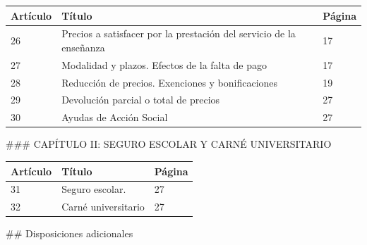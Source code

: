 \documentclass{article}
\begin{document}
\begin{itemize}
\begin{itemize}
\begin{scriptsize}
                  \vspace{0.4cm}
                  \begin{table}[h!]\centering\renewcommand{\arraystretch}{1.3}
                    \begin{tabular}{|p{}|p{}|p{}|}\hline
                      Artículo & Título                                                              & Página \\\hline
                      26       & Precios a satisfacer por la prestación del servicio de la enseñanza & 17     \\\hline
                      27       & Modalidad y plazos. Efectos de la falta de pago                     & 17     \\\hline
                      28       & Reducción de precios. Exenciones y bonificaciones                   & 19     \\\hline
                      29       & Devolución parcial o total de precios                               & 27     \\\hline
                      30       & Ayudas de Acción Social                                             & 27     \\\hline
                    \end{tabular}\end{table}
                  \vspace{0.4cm}

                  \#\#\# CAPÍTULO II: SEGURO ESCOLAR Y CARNÉ UNIVERSITARIO

                  \vspace{0.4cm}
                  \begin{table}[h!]\centering\renewcommand{\arraystretch}{1.3}
                    \begin{tabular}{|p{}|p{}|p{}|}\hline
                      Artículo & Título              & Página \\\hline
                      31       & Seguro escolar.     & 27     \\\hline
                      32       & Carné universitario & 27     \\\hline
                    \end{tabular}\end{table}
                  \vspace{0.4cm}

                  \#\# Disposiciones adicionales


\end{scriptsize}
\end{itemize}
\end{itemize}
\end{document}
